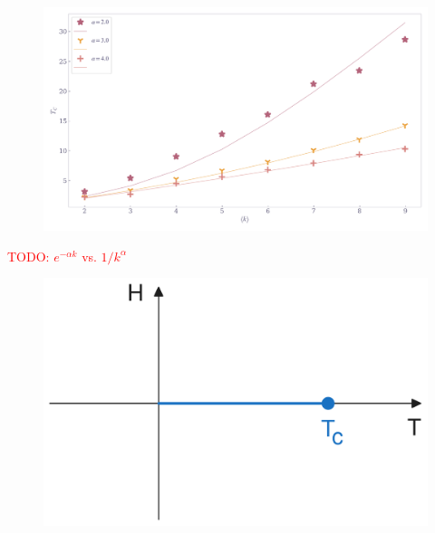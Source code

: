\documentclass[11pt,a4paper]{article}
\newcommand{\todo}[1]{\textcolor{red}{TODO: #1}}
\begin{document}
\begin{figure}[ht!]
    \includegraphics[width=\linewidth]{../figures/TC_vs_k.pdf}
\end{figure}

\todo{$e^{-\alpha k}$ vs. $1/k^\alpha$}

\begin{figure}[ht!]
    \centering
    \includegraphics[width=0.7\linewidth]{../figures/phase-diagram.pdf}
\end{figure}
\end{document}
